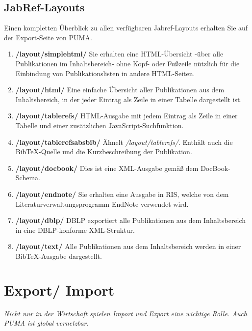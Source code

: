 \subsection{JabRef-Layouts}
Einen kompletten Überblick zu allen verfügbaren Jabref-Layouts erhalten Sie auf der Export-Seite von PUMA.
\begin{enumerate}
	\item  \textbf{/layout/simplehtml/}\newline
	Sie erhalten eine HTML-Übersicht -über alle Publikationen im 		Inhaltsbereich- ohne Kopf- oder Fußzeile nützlich für die 			Einbindung von Publikationslisten in andere HTML-Seiten.
	\item \textbf{/layout/html/}\newline
    Eine einfache Übersicht aller Publikationen aus dem Inhaltsbereich, in der jeder Eintrag als Zeile in einer Tabelle dargestellt ist.
	\item \textbf{/layout/tablerefs/} \newline
    HTML-Ausgabe mit jedem Eintrag als Zeile in einer Tabelle und einer zusätzlichen JavaScript-Suchfunktion.
\item \textbf{/layout/tablerefsabsbib/} \newline
    Ähnelt \textit{/layout/tablerefs/}. Enthält auch die BibTeX-Quelle und die Kurzbeschreibung der Publikation.
\item \textbf{/layout/docbook/} \newline
    Dies ist eine XML-Ausgabe gemäß dem DocBook-Schema.
\item \textbf{/layout/endnote/} \newline
    Sie erhalten eine Ausgabe in RIS, welche von dem Literaturverwaltungsprogramm EndNote verwendet wird.
\item \textbf{/layout/dblp/} \newline
    DBLP exportiert alle Publikationen aus dem Inhaltsbereich in eine DBLP-konforme XML-Struktur. 
\item \textbf{/layout/text/}\newline
    Alle Publikationen aus dem Inhaltsbereich werden in einer BibTeX-Ausgabe dargestellt.
\end{enumerate}

\newpage
\section{Export/ Import}
\textit{Nicht nur in der Wirtschaft spielen Import und Export eine wichtige Rolle. Auch PUMA ist global vernetzbar.}
